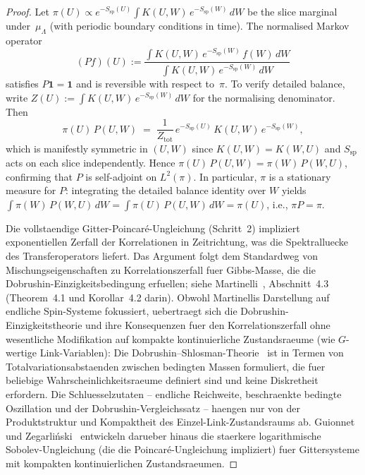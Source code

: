 \documentclass[12pt,a4paper]{article}
\theoremstyle{definition}
\theoremstyle{plain}
\theoremstyle{remark}
\begin{document}
\begin{proof}
Let $\pi(U) \propto e^{-S_{\mathrm{sp}}(U)}\int K(U,W)\,e^{-S_{\mathrm{sp}}(W)}\,dW$ be the slice marginal under~$\mu_\Lambda$ (with periodic boundary conditions in time). The normalised Markov operator
\begin{equation}
    (Pf)(U) := \frac{\int K(U,W)\,e^{-S_{\mathrm{sp}}(W)}\,f(W)\,dW}{\int K(U,W)\,e^{-S_{\mathrm{sp}}(W)}\,dW}
\end{equation}
satisfies $P\mathbf{1} = \mathbf{1}$ and is reversible with respect to~$\pi$. To verify detailed balance, write $Z(U) := \int K(U,W)\,e^{-S_{\mathrm{sp}}(W)}\,dW$ for the normalising denominator. Then
\[
  \pi(U)\,P(U,W) \;=\; \frac{1}{Z_{\mathrm{tot}}}\,e^{-S_{\mathrm{sp}}(U)}\,K(U,W)\,e^{-S_{\mathrm{sp}}(W)},
\]
which is manifestly symmetric in $(U,W)$ since $K(U,W) = K(W,U)$ and $S_{\mathrm{sp}}$ acts on each slice independently. Hence $\pi(U)\,P(U,W) = \pi(W)\,P(W,U)$, confirming that $P$ is self-adjoint on $L^2(\pi)$. In particular, $\pi$ is a stationary measure for $P$: integrating the detailed balance identity over $W$ yields $\int \pi(W)\,P(W,U)\,dW = \int \pi(U)\,P(U,W)\,dW = \pi(U)$, i.e., $\pi P = \pi$.

Die vollstaendige Gitter-Poincar\'e-Ungleichung (Schritt~2) impliziert exponentiellen Zerfall der Korrelationen in Zeitrichtung, was die Spektralluecke des Transferoperators liefert. Das Argument folgt dem Standardweg von Mischungseigenschaften zu Korrelationszerfall fuer Gibbs-Masse, die die Dobrushin-Einzigkeitsbedingung erfuellen; siehe Martinelli~\cite{Martinelli1999}, Abschnitt~4.3 (Theorem~4.1 und Korollar~4.2 darin). Obwohl Martinellis Darstellung auf endliche Spin-Systeme fokussiert, uebertraegt sich die Dobrushin-Einzigkeitstheorie und ihre Konsequenzen fuer den Korrelationszerfall ohne wesentliche Modifikation auf kompakte kontinuierliche Zustandsraeume (wie $G$-wertige Link-Variablen): Die Dobrushin--Shlosman-Theorie~\cite{DobrushinShlosman1985} ist in Termen von Totalvariationsabstaenden zwischen bedingten Massen formuliert, die fuer beliebige Wahrscheinlichkeitsraeume definiert sind und keine Diskretheit erfordern. Die Schluesselzutaten -- endliche Reichweite, beschraenkte bedingte Oszillation und der Dobrushin-Vergleichssatz -- haengen nur von der Produktstruktur und Kompaktheit des Einzel-Link-Zustandsraums ab. Guionnet und Zegar\-li\'nski~\cite{GuionnetZegarlinski2003} entwickeln darueber hinaus die staerkere logarithmische Sobolev-Ungleichung (die die Poincar\'e-Ungleichung impliziert) fuer Gittersysteme mit kompakten kontinuierlichen Zustandsraeumen.


\end{proof}
\end{document}
